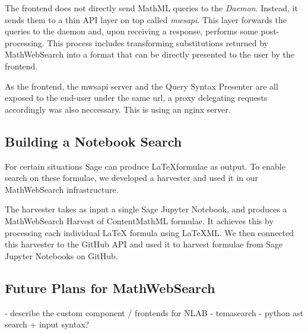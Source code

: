 The frontend does not directly send MathML queries to the \textit{Daemon}.
Instead, it sends them to a thin API layer on top called \textit{mwsapi}. 
This layer forwards the queries to the daemon and, upon receiving a response, performs some post-processing. 
This process includes transforming substitutions returned by MathWebSearch into a format that can be directly presented to the user by the frontend. 

As the frontend, the mwsapi server and the Query Syntax Presenter are all exposed to the end-user under the same url, a proxy delegating requests accordingly was also neccessary. 
This is using an nginx  server. 

\subsection{Building a Notebook Search}

For certain situations Sage can produce \LaTeX formulae as output. 
To enable search on these formulae, we developed a harvester and used it in our MathWebSearch infrastructure. 

The harvester takes as input a single Sage Jupyter Notebook, and produces a MathWebSearch Harvest of ContentMathML formulae. 
It achieves this by processing each individual LaTeX formula using LaTeXML. 
We then connected this harvester to the GitHub API and used it to harvest formulae from  Sage Jupyter Notebooks on GitHub. 


\subsection{Future Plans for MathWebSearch}

- describe the custom component / frontends for NLAB
- temasearch
- python ast search + input syntax?


